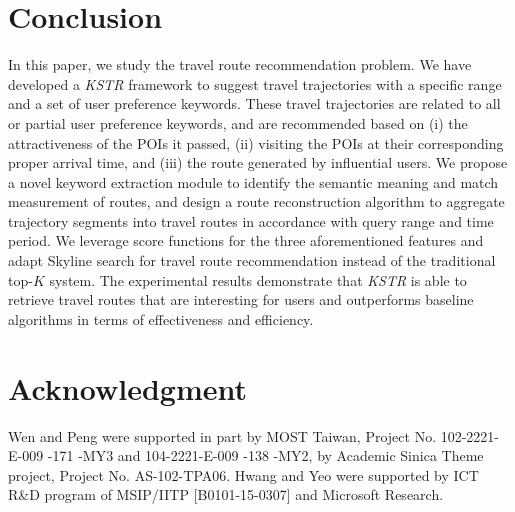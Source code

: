 \documentclass[10pt,conference,letterpaper]{IEEEtran}
\begin{document}






\nocite{PGT2014,Ye2012,WSDM2012finding,VLDB2010,ICDE2013,SDM2011,SIGMOD2010,rendle2010factorizing,WWW2009,ye2011exploiting,photo2trip,BBS,yuan2014graph,ge2010energy,MM2010,cao2012keyword,zheng2015approximate,SIGKDD07_TPM}

\section{Conclusion}
\vspace{-1mm}
In this paper, we study the travel route recommendation problem. We have developed a \textit{KSTR} framework to suggest travel trajectories with a specific range and a set of user preference keywords. These travel trajectories are related to all or partial user preference keywords, and are recommended based on (i) the attractiveness of the POIs it passed, (ii) visiting the POIs at their corresponding proper arrival time, and (iii) the route generated by influential users. We propose a novel keyword extraction module to identify the semantic meaning and match measurement of routes, and design a route reconstruction algorithm to aggregate trajectory segments into travel routes in accordance with query range and time period. We leverage score functions for the three aforementioned features and adapt Skyline search for travel route recommendation instead of the traditional top-$K$ system. The experimental results demonstrate that \textit{KSTR} is able to retrieve travel routes that are interesting for users and outperforms baseline algorithms in terms of effectiveness and efficiency.
\vspace{-1mm}

\section*{Acknowledgment}
Wen and Peng were supported in part by MOST Taiwan, Project No. 102-2221-E-009 -171 -MY3  and 104-2221-E-009 -138 -MY2, by Academic Sinica Theme project, Project No. AS-102-TPA06. Hwang and Yeo were supported by ICT R\&D program of MSIP/IITP [B0101-15-0307] and Microsoft Research.

\vspace{-1mm}

\IEEEpeerreviewmaketitle
\scriptsize



\end{document}
